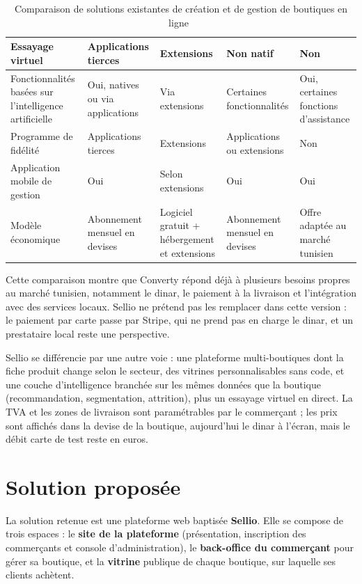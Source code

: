 \begin{table}[H]
{\begin{tabular}{|p{4.8cm}|p{2.7cm}|p{3cm}|p{2.7cm}|p{2.7cm}|}
Essayage virtuel
& Applications tierces
& Extensions
& Non natif
& Non \\

\hline

Fonctionnalités basées sur l'intelligence artificielle
& Oui, natives ou via applications
& Via extensions
& Certaines fonctionnalités
& Oui, certaines fonctions d'assistance \\

\hline

Programme de fidélité
& Applications tierces
& Extensions
& Applications ou extensions
& Non  \\

\hline

Application mobile de gestion
& Oui
& Selon extensions
& Oui
& Oui \\

\hline

Modèle économique
& Abonnement mensuel en devises
& Logiciel gratuit + hébergement et extensions
& Abonnement mensuel en devises
& Offre adaptée au marché tunisien \\

\hline

\end{tabular}
}
\caption{Comparaison de solutions existantes de création et de gestion de boutiques en ligne~
\cite{Shopify2026,WooCommerce2026,Wix2026,Converty2026}}
\label{tab:existing}
\end{table}

Cette comparaison montre que Converty répond déjà à plusieurs besoins propres au marché tunisien, notamment le dinar, le paiement à la livraison et l'intégration avec des services locaux. Sellio ne prétend pas les remplacer dans cette version : le paiement par carte passe par Stripe, qui ne prend pas en charge le dinar, et un prestataire local reste une perspective.

Sellio se différencie par une autre voie : une plateforme multi-boutiques dont la fiche produit change selon le secteur, des vitrines personnalisables sans code, et une couche d'intelligence branchée sur les mêmes données que la boutique (recommandation, segmentation, attrition), plus un essayage virtuel en direct. La TVA et les zones de livraison sont paramétrables par le commerçant ; les prix sont affichés dans la devise de la boutique, aujourd'hui le dinar à l'écran, mais le débit carte de test reste en euros.

\section{Solution proposée}
La solution retenue est une plateforme web baptisée \textbf{Sellio}. Elle se compose de trois espaces : le \textbf{site de la plateforme} (présentation, inscription des commerçants et console d'administration), le \textbf{back-office du commerçant} pour gérer sa boutique, et la \textbf{vitrine} publique de chaque boutique, sur laquelle ses clients achètent.

